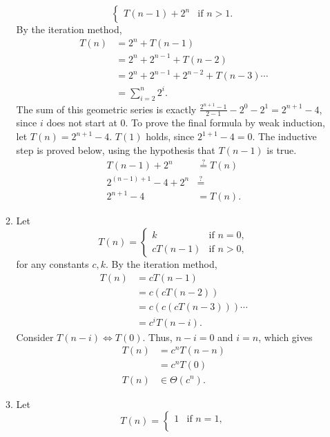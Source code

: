 \documentclass[12pt]{article}
\begin{document}
\begin{enumerate}
\begin{enumerate}
\[\begin{cases}
                T(n - 1) + 2^{n} &\text{if } n > 1.
            \end{cases}
        \] By the iteration method,
        \begin{align*}
            T(n) &= 2^{n} + T(n - 1) \\
            &= 2^{n} + 2^{n - 1} + T(n - 2) \\
            &= 2^{n} + 2^{n - 1} + 2^{n - 2} + T(n - 3) \cdots \\
            &= \sum_{i = 2}^{n} 2^{i}.
        \end{align*}
        The sum of this geometric series is exactly $\frac{2^{n + 1} - 1}{2 - 1} - 2^{0} - 2^{1} = 2^{n + 1} - 4$, since $i$ does not start at $0$. To prove the final formula by weak induction, let $T(n) = 2^{n + 1} - 4$. $T(1)$ holds, since $2^{1 + 1} - 4 = 0$. The inductive step is proved below, using the hypothesis that $T(n - 1)$ is true.
        \begin{align*}
            T(n - 1) + 2^{n} &\stackrel{?}{=} T(n) \\
            2^{(n - 1) + 1} - 4 + 2^{n} &\stackrel{?}{=} \\
            2^{n + 1} - 4 &= T(n).
        \end{align*}
        \item Let \[
            T(n) = \begin{cases}
                k &\text{if } n = 0, \\
                cT(n - 1) &\text{if } n > 0,
            \end{cases}
        \] for any constants $c, k$. By the iteration method,
        \begin{align*}
            T(n) &= cT(n - 1) \\
            &= c(cT(n - 2)) \\
            &= c(c(cT(n - 3))) \cdots \\
            &= c^{i} T(n - i).
        \end{align*}
        Consider $T(n - i) \Leftrightarrow T(0)$. Thus, $n - i = 0$ and $i = n$, which gives
        \begin{align*}
            T(n) &= c^{n} T(n - n)  \\
            &= c^{n} T(0) \\
            T(n) &\in \Theta(c^n).
        \end{align*}
        \item Let \[
            T(n) = \begin{cases}
                1 &\text{if } n = 1, \\

\end{cases}\]
\end{enumerate}
\end{enumerate}
\end{document}
